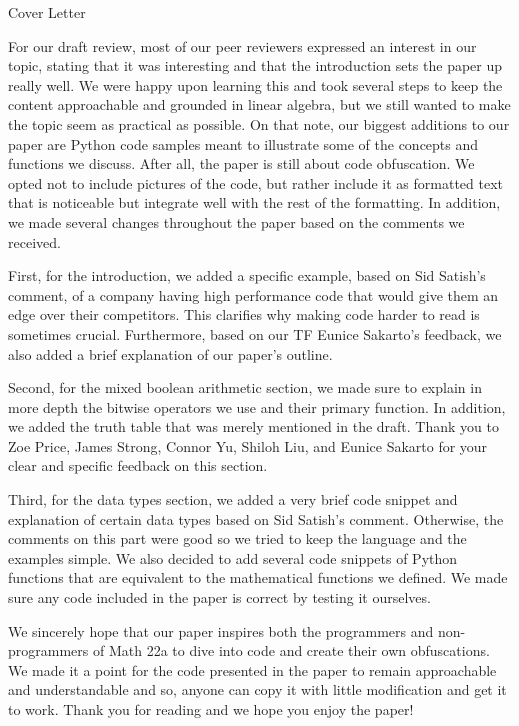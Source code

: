 \begin{center}
    {\huge Cover Letter}
\end{center}
\hspace{\parindent} For our draft review, most of our peer reviewers expressed
an
interest in our
topic, stating that it was interesting and that the introduction sets the paper
up really well. We were happy upon learning this and took several steps to keep
the content approachable and grounded in linear algebra, but we still wanted to
make the topic seem as practical as possible. On that note, our biggest
additions to our paper are Python code samples meant to illustrate some of the
concepts and functions we discuss. After all, the paper is still about code
obfuscation. We opted not to include pictures of the code, but rather include
it as formatted text that is noticeable but integrate well with the rest of the
formatting. In addition, we made several changes throughout the paper based on
the comments we received.

First, for the introduction, we added a specific example, based on Sid Satish's
comment, of a company having high performance code that would give them an edge
over their competitors. This clarifies why making code harder to read is
sometimes crucial. Furthermore, based on our TF Eunice Sakarto's feedback, we
also added a brief explanation of our paper's outline.

Second, for the mixed boolean arithmetic section, we made sure to explain in
more depth the bitwise operators we use and their primary function. In
addition, we added the truth table that was merely mentioned in the draft.
Thank you to Zoe Price, James Strong, Connor Yu, Shiloh Liu, and Eunice Sakarto
for your clear and specific feedback on this section.

Third, for the data types section, we added a very brief code snippet and
explanation of certain data types based on Sid Satish's comment. Otherwise,
the comments on this part were good so we tried to keep the language and the
examples simple. We also decided to add several code snippets of Python
functions that are equivalent to the mathematical functions we defined. We made
sure any code included in the paper is correct by testing it ourselves.

We sincerely hope that our paper inspires both the programmers and
non-programmers of Math 22a to dive into code and create their own
obfuscations. We made it a point for the code presented in the paper to remain
approachable and understandable and so, anyone can copy it with little
modification and get it to work. Thank you for reading and we hope you
enjoy the paper!







\newpage
